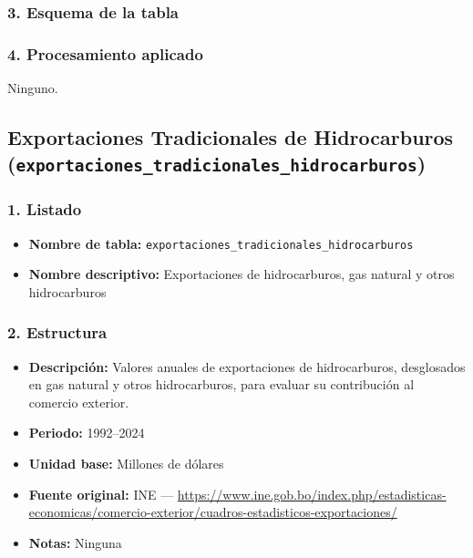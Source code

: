 \documentclass[12pt,a4paper]{article}
\begin{document}
\subsubsection*{3. Esquema de la tabla}

\subsubsection*{4. Procesamiento aplicado}
Ninguno.

\newpage
\subsection{Exportaciones Tradicionales de Hidrocarburos\\
\small(\texttt{exportaciones\_tradicionales\_hidrocarburos})}


\subsubsection*{1. Listado}
\begin{itemize}
  \item \textbf{Nombre de tabla:} \texttt{exportaciones\_tradicionales\_hidrocarburos}
  \item \textbf{Nombre descriptivo:} Exportaciones de hidrocarburos, gas natural y otros hidrocarburos
\end{itemize}

\subsubsection*{2. Estructura}
\begin{itemize}
  \item \textbf{Descripción:} Valores anuales de exportaciones de hidrocarburos, desglosados en gas natural y otros hidrocarburos, para evaluar su contribución al comercio exterior.
  \item \textbf{Periodo:} 1992--2024
  \item \textbf{Unidad base:} Millones de dólares
  \item \textbf{Fuente original:} INE — \url{https://www.ine.gob.bo/index.php/estadisticas-economicas/comercio-exterior/cuadros-estadisticos-exportaciones/}
  \item \textbf{Notas:} Ninguna
\end{itemize}
\end{document}
